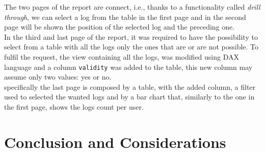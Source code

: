 \documentclass[12pt, a4paper, oneside]{article}
\begin{document}
The two pages of the report are connect, i.e., thanks to a functionality called \emph{drill through}, we can select a log from the table in the first page and in the second page will be shown the position
of the selected log and the preceding one.\\
In the third and last page of the report, it was required to have the possibility to select from a table with all the logs only the ones that are or are not possible. To fulfil the request, the view containing
all the logs, was modified using DAX language and a column \texttt{validity} was added to the table, this new column may assume only two values: yes or no.\\
specifically the last page is composed by a table, with the added column, a filter used to selected the wanted logs and by a bar chart that, similarly to the one in the first page, shows the logs count per user.

\newpage
\section{Conclusion and Considerations}
\end{document}

